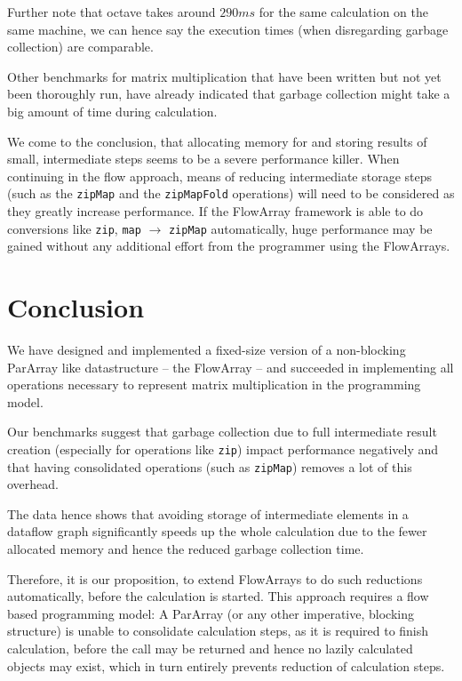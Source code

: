 \documentclass[runningheads,a4paper,fleqn]{llncs}
\begin{document}
Further note that octave \cite{eaton1997gnu} takes around $290 ms$ for
the same calculation on the same machine, we can hence say the
execution times (when disregarding garbage collection) are
comparable.

Other benchmarks for matrix multiplication that have been written but
not 
yet been thoroughly run, have already indicated that garbage
collection might take a big amount of time during calculation.

We come to the conclusion, that allocating memory for and
storing results of small, intermediate steps seems to be a severe
performance 
killer. When continuing in the flow approach, means of reducing
intermediate storage steps (such as the
\texttt{zipMap} and the \texttt{zipMapFold} operations) will need to
be considered as they greatly increase performance. If the FlowArray
framework is able to do conversions like \texttt{zip}, \texttt{map}
$\to$ \texttt{zipMap} automatically, huge performance may be gained
without any additional effort from the programmer using the FlowArrays.

\section{Conclusion}
\label{sec:conclusion}

We have designed and implemented a fixed-size version of a non-blocking
ParArray like datastructure -- the FlowArray -- and succeeded in
implementing all operations necessary to represent matrix
multiplication in the programming model.

Our benchmarks suggest that garbage collection due to full
intermediate result creation (especially for operations like
\texttt{zip}) impact performance negatively and that having
consolidated operations (such as \texttt{zipMap}) removes a lot of
this overhead.

The data hence shows that avoiding storage of intermediate elements in
a dataflow graph significantly speeds up the whole calculation due to the fewer
allocated memory and hence the reduced garbage collection time.

Therefore, it is our proposition, to extend FlowArrays to do such
reductions automatically, before the calculation is started. This
approach requires a flow based programming model: A ParArray (or
any other imperative, blocking structure) is
unable to consolidate calculation steps, as 
it is required to finish calculation, before the call may be returned
and hence no lazily calculated objects may exist, which in turn
entirely prevents reduction of calculation steps.



\end{document}
